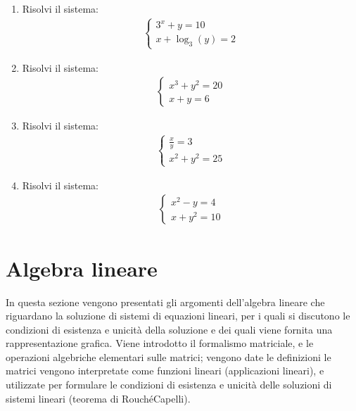 \documentclass[letterpaper,10pt,italian]{jupyterBook}
\begin{document}
\begin{enumerate}
\item {} 
\sphinxAtStartPar
Risolvi il sistema:
\begin{equation*}
\begin{split}
    \begin{cases}
    3^x + y = 10 \\
    x + \log_3(y) = 2
    \end{cases}
    \end{split}
\end{equation*}
\item {} 
\sphinxAtStartPar
Risolvi il sistema:
\begin{equation*}
\begin{split}
    \begin{cases}
    x^3 + y^2 = 20 \\
    x + y = 6
    \end{cases}
    \end{split}
\end{equation*}
\item {} 
\sphinxAtStartPar
Risolvi il sistema:
\begin{equation*}
\begin{split}
    \begin{cases}
    \frac{x}{y} = 3 \\
    x^2 + y^2 = 25
    \end{cases}
    \end{split}
\end{equation*}
\item {} 
\sphinxAtStartPar
Risolvi il sistema:
\begin{equation*}
\begin{split}
    \begin{cases}
    x^2 - y = 4 \\
    x + y^2 = 10
    \end{cases}
    \end{split}
\end{equation*}
\end{enumerate}

\sphinxstepscope


\chapter{Algebra lineare}
\label{\detokenize{ch/algebra/linear-algebra:algebra-lineare}}\label{\detokenize{ch/algebra/linear-algebra:math-hs-algebra-linear}}\label{\detokenize{ch/algebra/linear-algebra::doc}}
\sphinxAtStartPar
In questa sezione vengono presentati gli argomenti dell’algebra lineare che riguardano la soluzione di sistemi di equazioni lineari, per i quali si discutono le condizioni di esistenza e unicità della soluzione e dei quali viene fornita una rappresentazione grafica. Viene introdotto il formalismo matriciale, e le operazioni algebriche elementari sulle matrici; vengono date le definizioni  le matrici vengono interpretate come funzioni lineari (applicazioni lineari), e utilizzate per formulare le condizioni di esistenza e unicità delle soluzioni di sistemi lineari (teorema di Rouché\sphinxhyphen{}Capelli).
\end{document}
